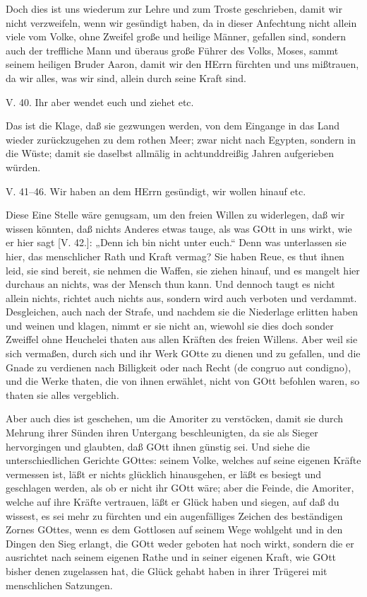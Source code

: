 Doch dies ist uns wiederum zur Lehre und zum Troste geschrieben, damit wir nicht verzweifeln, wenn wir gesündigt haben, da in dieser Anfechtung nicht allein viele vom Volke, ohne Zweifel große und heilige Männer, gefallen sind, sondern auch der treffliche Mann und überaus große Führer des Volks, Moses, sammt seinem heiligen Bruder Aaron, damit wir den HErrn fürchten und uns mißtrauen, da wir alles, was wir sind, allein durch seine Kraft sind.

\begin{schriftzitat}
V. 40. Ihr aber wendet euch und ziehet etc.
\end{schriftzitat}

Das ist die Klage, daß sie gezwungen werden, von dem Eingange in das Land wieder zurückzugehen zu dem rothen Meer; zwar nicht nach Egypten, sondern in die Wüste; damit sie daselbst allmälig in achtunddreißig Jahren aufgerieben würden.

\begin{schriftzitat}
V. 41–46. Wir haben an dem HErrn gesündigt, wir wollen hinauf etc.
\end{schriftzitat}

Diese Eine Stelle wäre genugsam, um den freien Willen zu widerlegen, daß wir wissen könnten, daß nichts Anderes etwas tauge, als was GOtt in uns wirkt, wie er hier sagt [V. 42.]: „Denn ich bin nicht unter euch.“ Denn was unterlassen sie hier, das menschlicher Rath und Kraft vermag? Sie haben Reue, es thut ihnen leid, sie sind bereit, sie nehmen die Waffen, sie ziehen hinauf, und es mangelt hier durchaus an nichts, was der Mensch thun kann. Und dennoch taugt es nicht allein nichts, richtet auch nichts aus, sondern wird auch verboten und verdammt. Desgleichen, auch nach der Strafe, und nachdem sie die Niederlage erlitten haben und weinen und klagen, nimmt er sie nicht an, wiewohl sie dies doch sonder Zweiffel ohne Heuchelei thaten aus allen Kräften des freien Willens. Aber weil sie sich vermaßen, durch sich und ihr Werk GOtte zu dienen und zu gefallen, und die Gnade zu verdienen nach Billigkeit oder nach Recht (de congruo aut condigno), und die Werke thaten, die von ihnen erwählet, nicht von GOtt befohlen waren, so thaten sie alles vergeblich.

Aber auch dies ist geschehen, um die Amoriter zu verstöcken, damit sie durch Mehrung ihrer Sünden ihren Untergang beschleunigten, da sie als Sieger hervorgingen und glaubten, daß GOtt ihnen günstig sei. Und siehe die unterschiedlichen Gerichte GOttes: seinem Volke, welches auf seine eigenen Kräfte vermessen ist, läßt er nichts glücklich hinausgehen, er läßt es besiegt und geschlagen werden, als ob er nicht ihr GOtt wäre; aber die Feinde, die Amoriter, welche auf ihre Kräfte vertrauen, läßt er Glück haben und siegen, auf daß du wissest, es sei mehr zu fürchten und ein augenfälliges Zeichen des beständigen Zornes GOttes, wenn es dem Gottlosen auf seinem Wege wohlgeht und in den Dingen den Sieg erlangt, die GOtt weder geboten hat noch wirkt, sondern die er ausrichtet nach seinem eigenen Rathe und in seiner eigenen Kraft, wie GOtt bisher denen zugelassen hat, die Glück gehabt haben in ihrer Trügerei mit menschlichen Satzungen.

